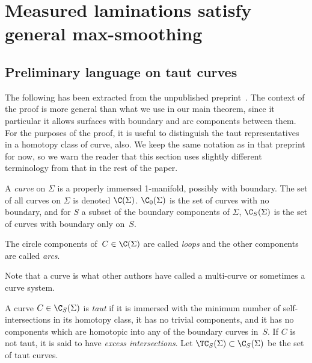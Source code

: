 \section{Measured laminations satisfy general max-smoothing}
\label{sec:maxsmoothing}

\subsection{Preliminary language on taut curves}

The following has been extracted from the unpublished preprint~\cite{Thu00:GeometricIntersection}.
The context of the proof is more general than what we use in our main theorem, since it particular it allows surfaces with boundary and arc components between them. For the purposes of the proof, it is useful to distinguish the taut representatives in a homotopy class of curve, also. We keep the same notation as in that preprint for now, so we warn the reader that this section uses slightly different terminology from that in the rest of the paper.

\begin{definition}
  \label{def:curve}
  A \emph{curve} on $\Sigma$ is a properly immersed 1-manifold, possibly
  with boundary.  The set of all curves on $\Sigma$ is denoted $\C(\Sigma)$.
  $\C_0(\Sigma)$ is the set of curves with no boundary, and for $S$ a
  subset of the boundary components of $\Sigma$, $\C_S(\Sigma)$ is the set of
  curves with boundary only on~$S$.

  The circle components of~$C \in \C(\Sigma)$ are called \emph{loops} and the
  other components are called \emph{arcs}.
\end{definition}

Note that a curve is what other authors have called a multi-curve or
sometimes a curve system.

\begin{definition}
  \label{def:taut}
  A curve $C \in \C_S(\Sigma)$ is \emph{taut} if it is immersed with the
  minimum number of self-intersections in its homotopy class, it has
  no trivial components, and it has no components which are homotopic
  into any of the boundary curves in~$S$.  If $C$ is not taut, it is
  said to have \emph{excess intersections}.  Let $\TC_S(\Sigma)
  \subset \C_S(\Sigma)$ be the set of taut curves.
\end{definition}

